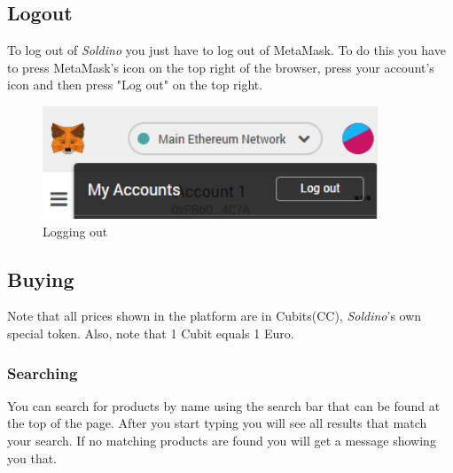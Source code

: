 	\subsection{Logout}
	To log out of \textit{Soldino} you just have to log out of 
	MetaMask\glosp. To do this you have to press MetaMask's icon on the top 
	right of the browser, press your account's icon and then press "Log out"
	on the top right.
	\begin{figure}[H]
		\includegraphics[width=10cm]{res/images/logout_metamask.png}
		\centering
		\caption{Logging out}
	\end{figure}
	\subsection{Buying}
	Note that all prices shown in the platform are in Cubits\glosp (CC\glo), 
	\textit{Soldino}'s own special token. Also, note that 1 Cubit equals 1 Euro.
		\subsubsection{Searching}
		You can search for products by name using the search bar that can be 
		found at the top of the page. After you start typing you will see 
		all results that match your search. If no matching products are found 
		you will get a message showing you that.
%		
